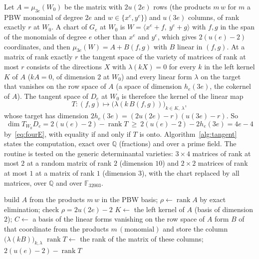 \documentclass[11pt]{article}
\theoremstyle{definition}
\theoremstyle{remark}
\newcommand{\Q}{\mathbb{Q}}
\newcommand{\F}{\mathbb{F}}
\begin{document}
Let $A=\mu_{3e}(W_0)$ be the matrix with $2u(2e)$ rows (the products $m\,w$ for $m$ a PBW monomial of degree $2e$ and $w\in\{x^e,y^e\}$) and $u(3e)$ columns, of rank exactly $r$ at $W_0$. A chart of $G_e$ at $W_0$ is $W=\langle x^e+f,\ y^e+g\rangle$ with $f,g$ in the span of the monomials of degree $e$ other than $x^e$ and $y^e$, which gives $2(u(e)-2)$ coordinates, and then $\mu_{3e}(W)=A+B(f,g)$ with $B$ linear in $(f,g)$. At a matrix of rank exactly $r$ the tangent space of the variety of matrices of rank at most $r$ consists of the directions $X$ with $\lambda(kX)=0$ for every $k$ in the left kernel $K$ of $A$ ($kA=0$, of dimension $2$ at $W_0$) and every linear form $\lambda$ on the target that vanishes on the row space of $A$ (a space of dimension $h_e(3e)$, the cokernel of $A$). The tangent space of $D_e$ at $W_0$ is therefore the kernel of the linear map
\begin{equation}\label{eq:Tmap}
T:(f,g)\longmapsto\big(\lambda(k\,B(f,g))\big)_{k\in K,\ \lambda},
\end{equation}
whose target has dimension $2h_e(3e)=(2u(2e)-r)(u(3e)-r)$. So
\begin{equation}\label{eq:tangentdim}
\dim T_{W_0}D_e=2(u(e)-2)-\operatorname{rank}T\ \ge\ 2(u(e)-2)-2h_e(3e)=4e-4
\end{equation}
by~\eqref{eq:fourE}, with equality if and only if $T$ is onto. Algorithm~\ref{alg:tangent} states the computation, exact over $\Q$ (fractions) and over a prime field. The routine is tested on the generic determinantal varieties: $3\times4$ matrices of rank at most $2$ at a random matrix of rank $2$ (dimension $10$) and $2\times2$ matrices of rank at most $1$ at a matrix of rank $1$ (dimension $3$), with the chart replaced by all matrices, over $\Q$ and over $\F_{32003}$.

\begin{algorithm}[htbp]
\caption{Tangent space of $D_e$ at $W_0$. Input: $e$ and a field $\Q$ or $\F_p$. Output: $\operatorname{rank}A$, $\dim K$, $\dim\operatorname{coker}A$, $\operatorname{rank}T$ and $\dim T_{W_0}D_e$.}
\label{alg:tangent}
\begin{algorithmic}[1]
\State build $A$ from the products $m\,w$ in the PBW basis; $\rho\gets\operatorname{rank}A$ by exact elimination; check $\rho=2u(2e)-2$
\State $K\gets$ the left kernel of $A$ (basis of dimension $2$); $C\gets$ a basis of the linear forms vanishing on the row space of $A$
  \State form $B$ of that coordinate from the products $m\,(\text{monomial})$ and store the column $\big(\lambda(kB)\big)_{k,\lambda}$
\EndFor
\State $\operatorname{rank}T\gets$ the rank of the matrix of these columns; \Return $2(u(e)-2)-\operatorname{rank}T$
\end{algorithmic}
\end{algorithm}
\end{document}

